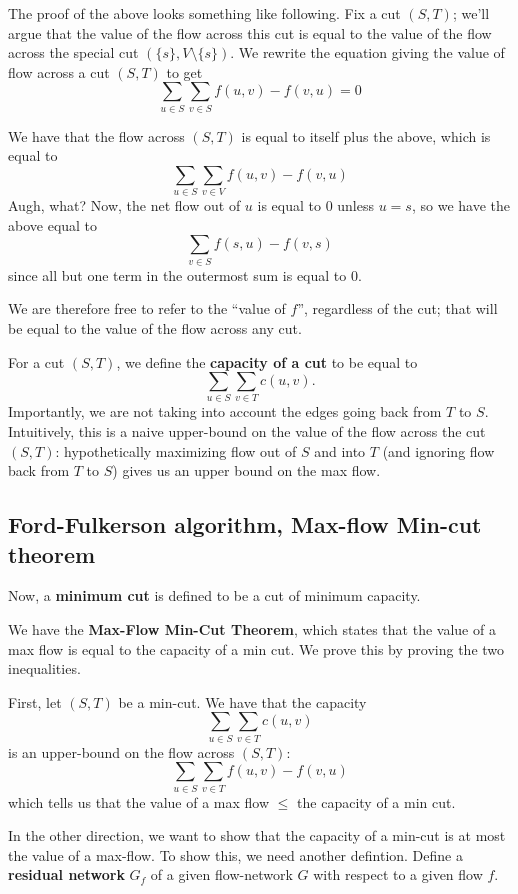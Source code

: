 \documentclass{article}
\begin{document}
The proof of the above looks something like following.
Fix a cut $(S,T)$; we'll argue that the value of the flow across this cut is
 equal to the value of the flow across the special cut
$ \left(\{s\}, V\setminus \{s\}\right)$.
We rewrite the equation giving the value of flow across a cut $(S,T)$ to get
$$
\sum_{u\in S} \sum_{v \in S} f(u,v) - f(v,u) = 0
$$

We have that the flow across $(S,T)$ is equal to itself plus the above,
which is equal to
$$
\sum_{u\in S}
\sum_{v\in V}
f(u,v) - f(v,u)
$$
Augh, what?
Now, the net flow out of $u$ is equal to $0$ unless $u=s$, so we
have the above equal to
$$
\sum_{v\in S} f(s,u) - f(v,s)
$$
since all but one term in the outermost sum is equal to $0$.

We are therefore free to refer to the ``value of $f$'', regardless of the cut;
that will be equal to the value of the flow across any cut.

For a cut $(S,T)$, we define the \textbf{capacity of a cut} to be
equal to
$$
\sum_{u\in S} \sum_{v\in T}
c(u,v).
$$
Importantly, we are not taking into account the edges going back
from $T$ to $S$.
Intuitively, this is a naive upper-bound on the value of the flow across
the cut $(S,T)$: hypothetically maximizing flow out of $S$ and into $T$
(and ignoring flow back from $T$ to $S$) gives us an upper bound on the 
max flow.

\subsection{Ford-Fulkerson algorithm, Max-flow Min-cut theorem}

Now, a \textbf{minimum cut} is defined to be a cut of minimum capacity.

We have the \textbf{Max-Flow Min-Cut Theorem}, which states that
the value of a max flow is equal to the capacity of a min cut.
We prove this by proving the two inequalities.

First, let $(S,T)$ be a min-cut. We have that the capacity
$$
\sum_{u\in S} \sum_{v\in T}
c(u,v)
$$
is an upper-bound on the flow across $(S,T)$:
$$
\sum_{u\in S} \sum_{v\in T}
	f(u,v) - f(v,u)
$$
which tells us that the value of a max flow $\leq$ the capacity
of a min cut.

In the other direction, we want to show that the capacity of a min-cut is
at most the value of a max-flow.
To show this, we need another defintion.
Define a \textbf{residual network} $G_f$ of a given flow-network $G$ with
respect to a given flow $f$.
\end{document}
